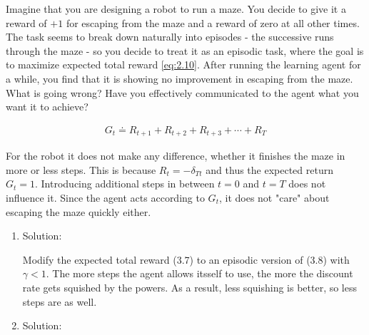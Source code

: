 
\begin{exercise}[Exercise 3.7]

Imagine that you are designing a robot to run a maze.
You decide to give it a reward of $+1$ for escaping from the maze and a reward of zero at all other times.
The task seems to break down naturally into episodes - the successive runs through the maze - so you decide to treat it as an episodic task, where the goal is to maximize expected total reward \eqref{eq:2.10}.
After running the learning agent for a while, you find that it is showing no improvement in escaping from the maze.
What is going wrong?
Have you effectively communicated to the agent what you want it to achieve?

\begin{align} \label{eq:2.10}
    G_t \doteq R_{t+1} + R_{t+2} + R_{t+3} + \cdots + R_T
\end{align}

\end{exercise}


\begin{solution}

For the robot it does not make any difference, whether it finishes the maze in more or less steps.
This is because $R_t = -\delta_{T t}$ and thus the expected return $G_t = 1$.
Introducing additional steps in between $t = 0$ and $t = T$ does not influence it.
Since the agent acts according to $G_t$, it does not "care" about escaping the maze quickly either.

\begin{enumerate}[label = \arabic*.]

    \item Solution:

    Modify the expected total reward (3.7) to an episodic version of (3.8) with $\gamma < 1$.
	The more steps the agent allows itsself to use, the more the discount rate gets squished by the powers.
	As a result, less squishing is better, so less steps are as well.

    \item Solution:

    \cite*[page 53]{SuttonRichardS2018Rl:a}

\end{enumerate}

\end{solution}

